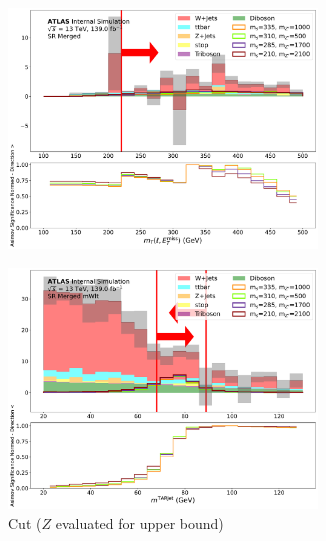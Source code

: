 \begin{figure}[htbp]
  \centering
    \begin{subfigure}[t]{0.48\textwidth}
    \centering
     \includegraphics[width = 0.9\textwidth]{Figures/5/SR1L_Merged/mT_lep_met_normSig_N_1.pdf}
    \caption{\mtlepmet}
    \end{subfigure}
    \begin{subfigure}[t]{0.48\textwidth}
    \centering
     \includegraphics[width = 0.9\textwidth]{Figures/5/SR1L_Merged_mWlt/TARJets10_mTAR0_normSig_N_1.pdf}
     \caption{\mTAR Cut (\(Z\) evaluated for upper bound)}
    \end{subfigure}
    \begin{subfigure}[t]{0.48\textwidth}
    \centering

\end{subfigure}
\end{figure}

